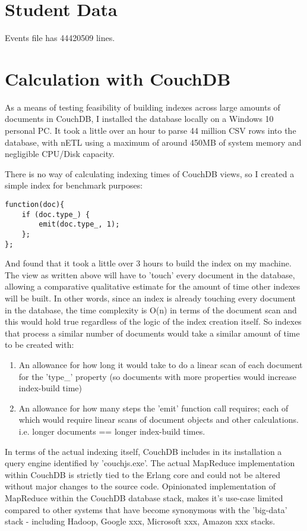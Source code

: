 \section{Student Data}
Events file has 44420509 lines.

\section{Calculation with CouchDB}
As a means of testing feasibility of building indexes across large amounts of documents in CouchDB, I installed the database locally on a Windows 10 personal PC. It took a little over an hour to parse 44 million CSV rows into the database, with nETL using a maximum of around 450MB of system memory and negligible CPU/Disk capacity.

There is no way of calculating indexing times of CouchDB views, so I created a simple index for benchmark purposes:

\begin{verbatim}
function(doc){
    if (doc.type_) {
        emit(doc.type_, 1);
    };
};
\end{verbatim}

And found that it took a little over 3 hours to build the index on my machine. The view as written above will have to 'touch' every document in the database, allowing a comparative qualitative estimate for the amount of time other indexes will be built. In other words, since an index is already touching every document in the database, the time complexity is O(n) in terms of the document scan and this would hold true regardless of the logic of the index creation itself. So indexes that process a similar number of documents would take a similar amount of time to be created with:

\begin{enumerate}
    \item An allowance for how long it would take to do a linear scan of each document for the 'type\_' property (so documents with more properties would increase index-build time)
    \item An allowance for how many steps the 'emit' function call requires; each of which would require linear scans of document objects and other calculations. i.e. longer documents == longer index-build times.
\end{enumerate}

In terms of the actual indexing itself, CouchDB includes in its installation a query engine identified by 'couchjs.exe'. The actual MapReduce implementation within CouchDB is strictly tied to the Erlang core and could not be altered without major changes to the source code. Opinionated implementation of MapReduce within the CouchDB database stack, makes it's use-case limited compared to other systems that have become synonymous with the 'big-data' stack - including Hadoop, Google xxx, Microsoft xxx, Amazon xxx stacks.

